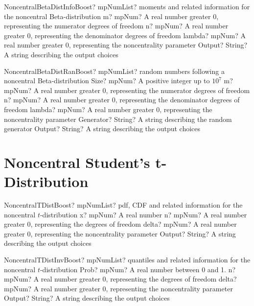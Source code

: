 \documentclass[12pt,a4paper,openany]{book}
\begin{document}
\begin{mpFunctionsExtract}
\mpFunctionFourNotImplemented
{NoncentralBetaDistInfoBoost? mpNumList? moments and related information for the noncentral Beta-distribution}
{m? mpNum? A real number greater 0, representing the numerator  degrees of freedom}
{n? mpNum? A real number greater 0, representing the denominator degrees of freedom}
{lambda? mpNum? A real number greater 0, representing the noncentrality parameter}
{Output? String? A string describing the output choices}
\end{mpFunctionsExtract}

\begin{mpFunctionsExtract}
\mpFunctionSixNotImplemented
{NoncentralBetaDistRanBoost? mpNumList? random numbers following a noncentral Beta-distribution}
{Size? mpNum? A positive integer up to $10^7$}
{m? mpNum? A real number greater 0, representing the numerator  degrees of freedom}
{n? mpNum? A real number greater 0, representing the denominator degrees of freedom}
{lambda? mpNum? A real number greater 0, representing the noncentrality parameter}
{Generator? String? A string describing the random generator}
{Output? String? A string describing the output choices}
\end{mpFunctionsExtract}

\section{Noncentral Student's t-Distribution}

\begin{mpFunctionsExtract}
\mpFunctionFourNotImplemented
{NoncentralTDistBoost? mpNumList? pdf, CDF and related information for the noncentral $t$-distribution}
{x? mpNum? A real number}
{n? mpNum? A real number greater 0, representing the degrees of freedom}
{delta? mpNum? A real number greater 0, representing the noncentrality parameter}
{Output? String? A string describing the output choices}
\end{mpFunctionsExtract}

\begin{mpFunctionsExtract}
\mpFunctionFourNotImplemented
{NoncentralTDistInvBoost? mpNumList? quantiles and related information for the  noncentral $t$-distribution}
{Prob? mpNum? A real number between 0 and 1.}
{n? mpNum? A real number greater 0, representing the degrees of freedom}
{delta? mpNum? A real number greater 0, representing the noncentrality parameter}
{Output? String? A string describing the output choices}
\end{mpFunctionsExtract}
\end{document}
